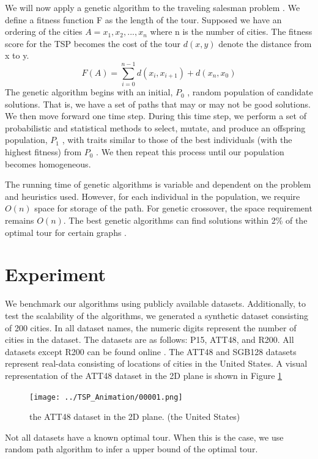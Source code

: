 \documentclass[10pt,twocolumn,letterpaper]{article}
\begin{document}
We will now apply a genetic algorithm to the traveling
salesman problem \cite{bryant2000genetic}. We define a fitness function F as the
length of the tour. Supposed we have an ordering of the
cities $A = {x_1 , x_2 , ..., x_n }$ where n is the number of cities.
The fitness score for the TSP becomes the cost of the tour
$d(x, y)$ denote the distance from x to y.
\begin{equation}
	F(A) =\sum_{i=0}^{n-1} d(x_i , x_{i+1}) + d(x_n , x_0 )
\end{equation}
The genetic algorithm begins with an initial, $P_0$ , random
population of candidate solutions. That is, we have a set of
paths that may or may not be good solutions. We then move
forward one time step. During this time step, we perform a
set of probabilistic and statistical methods to select, mutate,
and produce an offspring population, $P_1$ , with traits similar
to those of the best individuals (with the highest fitness)
from $P_0$ . We then repeat this process until our population becomes homogeneous.

The running time of genetic algorithms is variable and dependent on the problem and heuristics used. However, for
each individual in the population, we require $O(n)$ space for
storage of the path. For genetic crossover, the space requirement remains $O(n)$. The best genetic algorithms can find solutions within 2\% of the optimal tour for certain graphs \cite{homaifar1992schema}.

\section{Experiment}\label{sec:exp}
We benchmark our algorithms using publicly available
datasets. 
Additionally, to test the scalability of the algorithms, we generated a synthetic dataset consisting of 200 cities. 
In all dataset names, the numeric digits represent
the number of cities in the dataset. 
The datasets are as follows: P15, ATT48, and R200.
All datasets except R200 can be found online \cite{data0}\cite{data1}. The
ATT48 and SGB128 datasets represent real-data consisting
of locations of cities in the United States. 
A visual representation of the ATT48 dataset in the 2D plane is shown
in Figure \ref{fig:00001}
\begin{figure}
\centering
\texttt{[image: ../TSP\_Animation/00001.png]}
\caption{the ATT48 dataset in the 2D plane. (the United States)}
\label{fig:00001}
\end{figure}

Not all datasets have a known optimal tour. When this is the case, we use random path algorithm to infer a upper bound of the optimal tour. 
\end{document}
